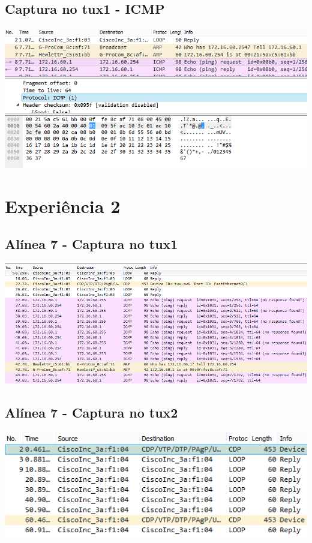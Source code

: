 \documentclass[11pt,a4paper,reqno]{report}
\numberwithin{equation}{section}
\begin{document}
\begin{appendices}
\subsection{Captura no tux1 - ICMP}
\includegraphics[width=16cm]{ex1_icmp.png}

\section{Experiência 2}%
\label{ex_2}
\subsection{Alínea 7 - Captura no tux1}
\includegraphics[width=16cm]{ex2_a7_tux1.png}
\subsection{Alínea 7 - Captura no tux2}
\label{ex2_tux1ping_tux2}
\includegraphics[width=16cm]{ex2_a7_tux2.png}

\end{appendices}
\end{document}
